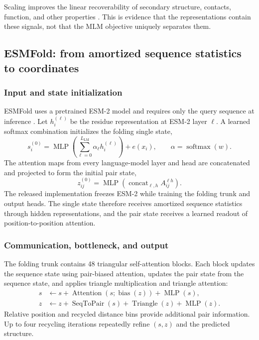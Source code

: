 \documentclass[10pt]{article}
\begin{document}
Scaling improves the linear recoverability of secondary structure, contacts, function, and other
properties \cite{rives2021,lin2023}.  This is evidence that the representations contain these
signals, not that the MLM objective uniquely separates them.

\subsection{ESMFold: from amortized sequence statistics to coordinates}

\subsubsection{Input and state initialization}

ESMFold uses a pretrained ESM-2 model and requires only the query sequence at inference
\cite{lin2023}.  Let $h_i^{(\ell)}$ be the residue representation at ESM-2 layer $\ell$.  A learned
softmax combination initializes the folding single state,
\begin{equation}
s_i^{(0)}
=\operatorname{MLP}
\left(
\sum_{\ell=0}^{L_{\mathrm{LM}}}
\alpha_{\ell}h_i^{(\ell)}
\right)
+e(x_i),
\qquad
\alpha=\operatorname{softmax}(w).
\label{eq:esmfold-single-init}
\end{equation}
The attention maps from every language-model layer and head are concatenated and projected to form
the initial pair state,
\begin{equation}
z_{ij}^{(0)}
=\operatorname{MLP}
\left(
\operatorname{concat}_{\ell,h}
A_{ij}^{\ell h}
\right).
\label{eq:esmfold-pair-init}
\end{equation}
The released implementation freezes ESM-2 while training the folding trunk and output heads.  The
single state therefore receives amortized sequence statistics through hidden representations, and
the pair state receives a learned readout of position-to-position attention.

\subsubsection{Communication, bottleneck, and output}

The folding trunk contains 48 triangular self-attention blocks.  Each block updates the sequence
state using pair-biased attention, updates the pair state from the sequence state, and applies
triangle multiplication and triangle attention:
\begin{align}
s&\leftarrow s+\operatorname{Attention}(s;\operatorname{bias}(z))
+\operatorname{MLP}(s),\\
z&\leftarrow z+\operatorname{SeqToPair}(s)
+\operatorname{Triangle}(z)+\operatorname{MLP}(z).
\label{eq:esmfold-trunk}
\end{align}
Relative position and recycled distance bins provide additional pair information.  Up to four
recycling iterations repeatedly refine $(s,z)$ and the predicted structure.
\end{document}
